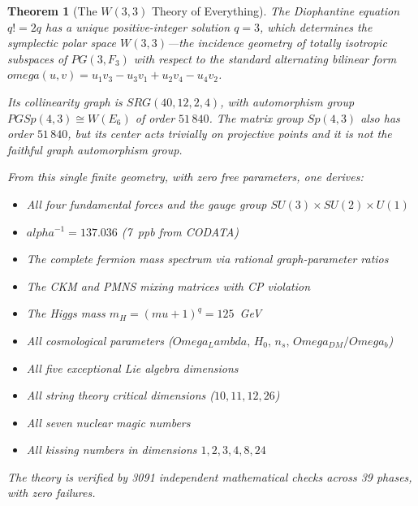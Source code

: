 \documentclass[12pt,a4paper]{article}
\def\mathbb#1{#1}%
\def\mathrm#1{#1}%
\def\textbf#1{#1}%
\def\omega{omega}%
\def\alpha{alpha}%
\def\Lambda{Lambda}%
\def\mu{mu}%
\def\Omega{Omega}%
\newtheorem{theorem}{Theorem}[section]
\theoremstyle{definition}
\newcommand{\SRG}{\mathrm{SRG}}
\newcommand{\PG}{\mathrm{PG}}
\newcommand{\Sp}{\mathrm{Sp}}
\newcommand{\SU}{\mathrm{SU}}
\newcommand{\FF}{\mathbb{F}}
\begin{document}
\begin{tcolorbox}[colback=blue!5!white,colframe=blue!75!black,
  title=\textbf{The Final Theorem}]
\begin{theorem}[The $W(3,3)$ Theory of Everything]
\label{thm:final}
The Diophantine equation $q!=2q$ has a unique positive-integer solution
$q=3$, which determines the symplectic polar space $W(3,3)$---the
incidence geometry of totally isotropic subspaces of $\PG(3,\FF_3)$
with respect to the standard alternating bilinear form
$\omega(u,v) = u_1v_3 - u_3v_1 + u_2v_4 - u_4v_2$.

Its collinearity graph is $\SRG(40,12,2,4)$, with automorphism group
$\mathrm{PGSp}(4,3)\cong W(E_6)$ of order $51\,840$.  The matrix group
$\Sp(4,3)$ also has order $51\,840$, but its center acts trivially on
projective points and it is not the faithful graph automorphism group.

From this single finite geometry, with \textbf{zero free parameters},
one derives:
\begin{itemize}[nosep]
\item All four fundamental forces and the gauge group
  $\SU(3)\times\SU(2)\times\mathrm{U}(1)$
\item $\alpha^{-1} = 137.036$ (7~ppb from CODATA)
\item The complete fermion mass spectrum via rational graph-parameter ratios
\item The CKM and PMNS mixing matrices with CP violation
\item The Higgs mass $m_H = (\mu+1)^q = 125$~GeV
\item All cosmological parameters
  ($\Omega_\Lambda,\,H_0,\,n_s,\,\Omega_{\mathrm{DM}}/\Omega_b$)
\item All five exceptional Lie algebra dimensions
\item All string theory critical dimensions ($10,11,12,26$)
\item All seven nuclear magic numbers
\item All kissing numbers in dimensions $1,2,3,4,8,24$
\end{itemize}

The theory is verified by \textbf{3091 independent mathematical
checks across 39 phases, with zero failures}.
\end{theorem}
\end{tcolorbox}


\end{document}
